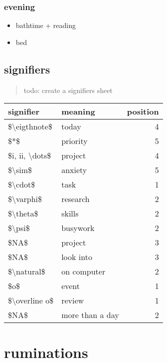 \documentclass[]{book}
\providecommand{\tightlist}{%
  \setlength{\itemsep}{0pt}\setlength{\parskip}{0pt}}
\begin{document}
\hypertarget{evening}{%
\subsection{evening}\label{evening}}

\begin{itemize}
\tightlist
\item
  bathtime + reading
\item
  bed
\end{itemize}

\hypertarget{signifiers}{%
\section{signifiers}\label{signifiers}}

\begin{quote}
todo: create a signifiers sheet
\end{quote}

\begin{tabular}{l|l|r}
\hline
signifier & meaning & position\\
\hline
\$\textbackslash{}eigthnote\$ & today & 4\\
\hline
\$*\$ & priority & 5\\
\hline
\$i, ii, \textbackslash{}dots\$ & project & 4\\
\hline
\$\textbackslash{}sim\$ & anxiety & 5\\
\hline
\$\textbackslash{}cdot\$ & task & 1\\
\hline
\$\textbackslash{}varphi\$ & research & 2\\
\hline
\$\textbackslash{}theta\$ & skills & 2\\
\hline
\$\textbackslash{}psi\$ & busywork & 2\\
\hline
\$NA\$ & project & 3\\
\hline
\$NA\$ & look into & 3\\
\hline
\$\textbackslash{}natural\$ & on computer & 2\\
\hline
\$o\$ & event & 1\\
\hline
\$\textbackslash{}overline o\$ & review & 1\\
\hline
\$NA\$ & more than a day & 2\\
\hline
\end{tabular}

\hypertarget{ruminations}{%
\chapter{ruminations}\label{ruminations}}
\end{document}
